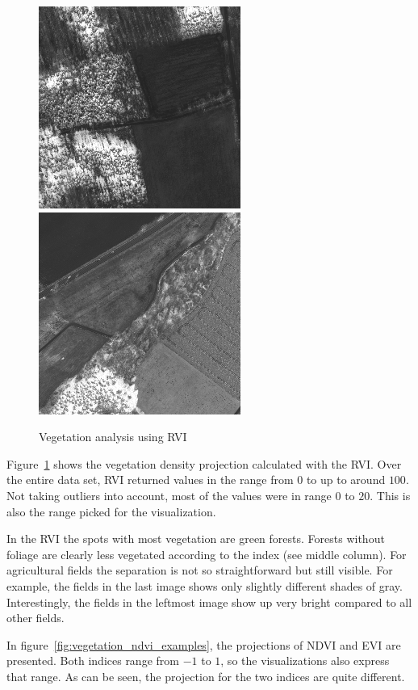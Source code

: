 \begin{figure}
    \includegraphics[width=\VegetationIndicesImageWidth]{images/vegetation/rvi/4} \hfill
    \includegraphics[width=\VegetationIndicesImageWidth]{images/vegetation/rvi/5}

    \caption{Vegetation analysis using RVI}
    \label{fig:vegetation_rvi_examples}
\end{figure}

Figure~\ref{fig:vegetation_rvi_examples} shows the vegetation density projection calculated with the RVI. Over the entire data set, RVI returned values in the range from $0$ to up to around $100$. Not taking outliers into account, most of the values were in range $0$ to $20$. This is also the range picked for the visualization. 

In the RVI the spots with most vegetation are green forests. Forests without foliage are clearly less vegetated according to the index (see middle column). For agricultural fields the separation is not so straightforward but still visible. For example, the fields in the last image shows only slightly different shades of gray. Interestingly, the fields in the leftmost image show up very bright compared to all other fields. 

In figure~\ref{fig:vegetation_ndvi_examples}, the projections of NDVI and EVI are presented. Both indices range from $-1$ to $1$, so the visualizations also express that range. As can be seen, the projection for the two indices are quite different.

